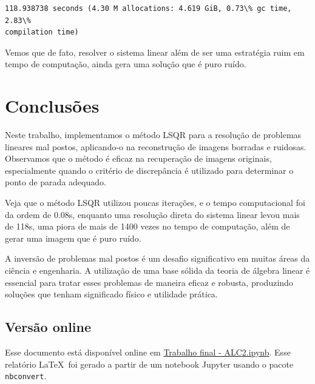 \documentclass[11pt]{article}
\let\Oldlatex\LaTeX
\renewcommand{\LaTeX}{\textrm{\Oldlatex}}
\newcommand{\prompt}[4]{
        {\ttfamily\llap{{\color{#2}[#3]:\hspace{3pt}#4}}\vspace{-\baselineskip}}
    }
\begin{document}
    \begin{Verbatim}[commandchars=\\\{\}]
118.938738 seconds (4.30 M allocations: 4.619 GiB, 0.73\% gc time, 2.83\%
compilation time)
    \end{Verbatim}
 
            
\prompt{Out}{outcolor}{ }{}
    
    \begin{center}
    \end{center} 
    
    Vemos que de fato, resolver o sistema linear além de ser uma estratégia
ruim em tempo de computação, ainda gera uma solução que é puro ruído.


    
\section*{Conclusões}

    Neste trabalho, implementamos o método LSQR para a resolução de
problemas lineares mal postos, aplicando-o na reconstrução de imagens
borradas e ruidosas. Observamos que o método é eficaz na recuperação de
imagens originais, especialmente quando o critério de discrepância é
utilizado para determinar o ponto de parada adequado.

Veja que o método LSQR utilizou poucas iterações, e o tempo computacional foi da ordem de 0.08s, enquanto uma resolução direta do sistema linear levou mais de 118s, uma piora de mais de 1400 vezes no tempo de computação, além de gerar uma imagem que é puro ruído.

A inversão de problemas mal postos é um desafio significativo em muitas áreas da ciência e engenharia. A utilização de uma base sólida da teoria de álgebra linear é essencial para tratar esses problemas de maneira eficaz e robusta, produzindo soluções que tenham significado físico e utilidade prática.

\subsection*{Versão online}

Esse documento está disponível online em \href{https://colab.research.google.com/drive/1yi3uQLi2Yvgg8fH2dJRRlqH82SuueUYv}{Trabalho final - ALC2.ipynb}. 
Esse relatório \LaTeX~foi gerado a partir de um notebook Jupyter usando o pacote \texttt{nbconvert}.
    
    
\end{document}
